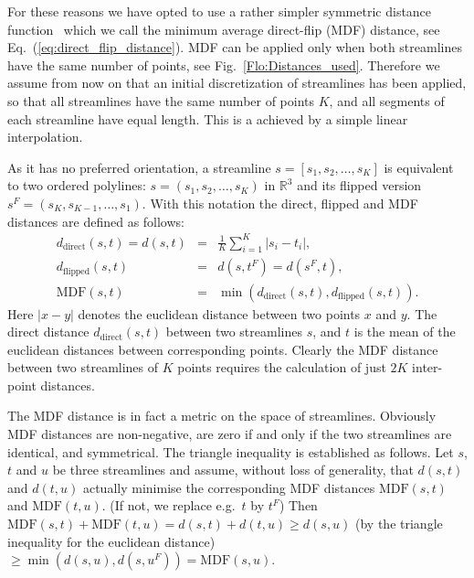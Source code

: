 \documentclass{bioinfo}
\begin{document}
\begin{methods}
For these reasons we have opted to use a rather simpler symmetric
distance function~\citep{EGMB10, Visser2010} which we call the minimum
average direct-flip (MDF) distance, see
Eq.~(\ref{eq:direct_flip_distance}). MDF can be applied only when both
streamlines have the same number of points, see
Fig.~\ref{Flo:Distances_used}. Therefore we assume from now on that an initial
discretization of streamlines has been applied, so that all streamlines
have the same number of points $K$, and all segments of
each streamline have equal length. This is a achieved by a simple linear interpolation.

As it has no preferred orientation, a streamline $s=[s_1, s_2, \ldots, s_K]$ is equivalent to
two ordered polylines: $s = (s_1, s_2, \ldots, s_K)$ in $\mathbb{R}^3$
and its flipped version $s^F = (s_K, s_{K-1}, \ldots, s_1)$.  With this
notation the direct, flipped and MDF distances are defined as follows:
\begin{eqnarray}
  d_{\textrm{direct}}(s, t) = d(s, t) & = & \frac{1}{K}\sum_{i=1}^{K}|s_{i}-t_{i}|,\nonumber\\
  d_{\textrm{flipped}}(s, t) & = & d(s,t^F) = d(s^F,t),\nonumber\\
  \textrm{MDF}(s, t) & = & \min(d_{\textrm{direct}}(s, t), d_{\textrm{flipped}}(s, t))\label{eq:direct_flip_distance}.
\end{eqnarray}
\noindent
Here $|x-y|$ denotes the euclidean distance between two points $x$ and
$y$. The direct distance $d_{\mathrm{direct}}(s, t)$ between two
streamlines $s$, and $t$ is the mean of the euclidean distances between
corresponding points. Clearly the MDF distance between two streamlines
of $K$ points requires the calculation of just $2K$ inter-point
distances.

The MDF distance is in fact a metric on the space of streamlines.
Obviously MDF distances are non-negative, are zero if and only if the
two streamlines are identical, and symmetrical.  The triangle inequality
is established as follows. Let $s$, $t$ and $u$ be three streamlines
and assume, without loss of generality, that $d(s,t)$ and $d(t,u)$ actually
minimise the corresponding MDF distances $\mathrm{MDF}(s,t)$ and
$\mathrm{MDF}(t,u)$. (If not, we replace e.g.~$t$ by $t^F$) Then
$\mathrm{MDF}(s, t) + \mathrm{MDF}(t, u) = d(s, t) + d(t, u) \ge d(s,
u)$ (by the triangle inequality for the euclidean distance) $ \ge
\min(d(s,u), d(s, u^F)) = \mathrm{MDF}(s, u)$.


\end{methods}
\end{document}
